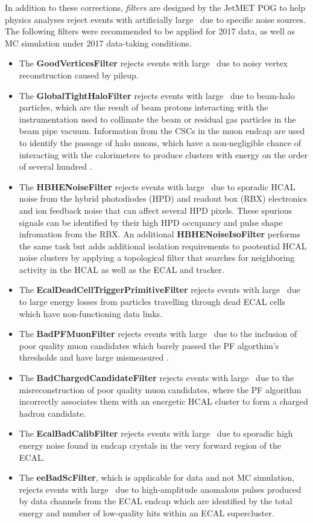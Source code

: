 In addition to these corrections, \textit{filters} are designed by the JetMET POG to help physics analyses reject events with artificially large \pTmiss\ due to specific noise sources. The following filters were recommended to be applied for 2017 data, as well as MC simulation under 2017 data-taking conditions.
\begin{itemize}
  \item The \textbf{GoodVerticesFilter} rejects events with large \pTmiss\ due to noisy vertex reconstruction caused by pileup. 
  \item The \textbf{GlobalTightHaloFilter} rejects events with large \pTmiss\ due to beam-halo particles, which are the result of beam protons interacting with the instrumentation used to collimate the beam or residual gas particles in the beam pipe vacuum. Information from the CSCs in the muon endcap are used to identify the passage of halo muons, which have a non-negligible chance of interacting with the calorimeters to produce clusters with energy on the order of several hundred \GeV.
  \item The \textbf{HBHENoiseFilter} rejects events with large \pTmiss\ due to sporadic HCAL noise from the hybrid photodiodes (HPD) and readout box (RBX) electronics and ion feedback noise that can affect several HPD pixels. These spurious signals can be identified by their high HPD occupancy and pulse shape infromation from the RBX. An additional \textbf{HBHENoiseIsoFilter} performs the same task but adds additional isolation requirements to pootential HCAL noise clusters by applying a topological filter that searches for neighboring activity in the HCAL as well as the ECAL and tracker.
  \item The \textbf{EcalDeadCellTriggerPrimitiveFilter} rejects events with large \pTmiss\ due to large energy losses from particles travelling through dead ECAL cells which have non-functioning data links.
  \item The \textbf{BadPFMuonFilter} rejects events with large \pTmiss\ due to the inclusion of poor quality muon candidates which barely passed the PF algorthim's thresholds and have large mismeasured \pT.
  \item The \textbf{BadChargedCandidateFilter} rejects events with large \pTmiss\ due to the misreconstruction of poor quality muon candidates, where the PF algorithm incorrectly associates them with an energetic HCAL cluster to form a charged hadron candidate.
  \item The \textbf{EcalBadCalibFilter} rejects events with large \pTmiss\ due to sporadic high energy noise found in endcap crystals in the very forward region of the ECAL.
  \item The \textbf{eeBadScFilter}, which is applicable for data and not MC simulation, rejects events with large \pTmiss\ due to high-amplitude anomalous pulses produced by data channels from the ECAL endcap which are identified by the total energy and number of low-quality hits within an ECAL supercluster.
\end{itemize}

